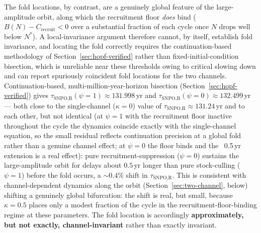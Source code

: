\documentclass[twocolumn,10pt]{article}
\begin{document}
The fold locations, by contrast, are a genuinely global feature of the large-amplitude orbit, along which the recruitment floor \emph{does} bind ($B(N)-C_{\text{recruit}}<0$ over a substantial fraction of each cycle once $N$ drops well below $N^*$). A local-invariance argument therefore cannot, by itself, establish fold invariance, and locating the fold correctly requires the continuation-based methodology of Section~\ref{sec:hopf-verified} rather than fixed-initial-condition bisection, which is unreliable near these thresholds owing to critical slowing down and can report spuriously coincident fold locations for the two channels. Continuation-based, multi-million-year-horizon bisection (Section~\ref{sec:hopf-verified}) gives $\tau_{\text{SNPO,R}}(\psi{=}1)\approx131.998$\,yr and $\tau_{\text{SNPO,R}}(\psi{=}0)\approx132.499$\,yr — both close to the single-channel ($\kappa=0$) value of $\tau_{\text{SNPO,R}}\approx131.24$\,yr and to each other, but not identical (at $\psi=1$ with the recruitment floor inactive throughout the cycle the dynamics coincide exactly with the single-channel equation, so the small residual reflects continuation precision at a global fold rather than a genuine channel effect; at $\psi=0$ the floor binds and the ~0.5\,yr extension is a real effect): pure recruitment-suppression ($\psi=0$) sustains the large-amplitude orbit for delays about $0.5$\,yr longer than pure stock-culling ($\psi=1$) before the fold occurs, a $\sim\!0.4\%$ shift in $\tau_{\text{SNPO,R}}$. This is consistent with channel-dependent dynamics along the orbit (Section~\ref{sec:two-channel}, below) shifting a genuinely global bifurcation: the shift is real, but small, because $\kappa=0.5$ places only a modest fraction of the cycle in the recruitment-floor-binding regime at these parameters. The fold location is accordingly \textbf{approximately, but not exactly, channel-invariant} rather than exactly invariant.
\end{document}
